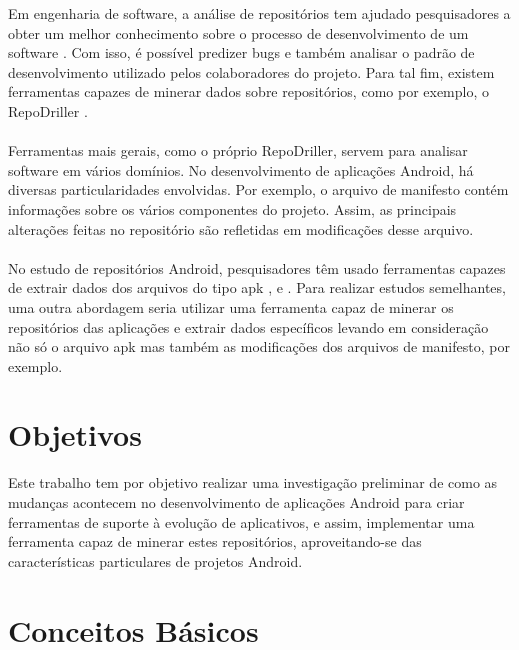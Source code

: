 \documentclass[a4paper,12pt]{article}
\numberwithin{figure}{section}
\begin{document}
Em engenharia de software, a análise de repositórios tem ajudado pesquisadores a
obter um melhor conhecimento sobre o processo de desenvolvimento de um
software \cite{miningGit}. Com isso, é possível predizer bugs e também analisar o padrão de
desenvolvimento utilizado pelos colaboradores do projeto. Para tal fim, existem
ferramentas capazes de minerar dados sobre repositórios, como por exemplo, o
RepoDriller \cite{repodriller}.\\
\\
Ferramentas mais gerais, como o próprio RepoDriller, servem para analisar
software em vários domínios. No desenvolvimento de aplicações Android, há
diversas particularidades envolvidas. Por exemplo, o arquivo de manifesto contém
informações sobre os vários componentes do projeto. Assim, as principais
alterações feitas no repositório são refletidas em modificações desse arquivo.\\
\\
No estudo de repositórios Android, pesquisadores têm usado ferramentas capazes
de extrair dados dos arquivos do tipo apk \cite{Calciati}, \cite{WhoAdded} e \cite{YLyu}. Para realizar estudos
semelhantes, uma outra abordagem seria utilizar uma ferramenta capaz de
minerar os repositórios das aplicações e extrair dados específicos levando em
consideração não só o arquivo apk mas também as modificações dos arquivos de
manifesto, por exemplo.\\


\newpage
\section{Objetivos}

Este trabalho tem por objetivo realizar uma investigação preliminar de como as
mudanças acontecem no desenvolvimento de aplicações Android para criar
ferramentas de suporte à evolução de aplicativos, e assim, implementar uma
ferramenta capaz de minerar estes repositórios, aproveitando-se das
características particulares de projetos Android.\\



\newpage

\section{Conceitos Básicos}
\end{document}
